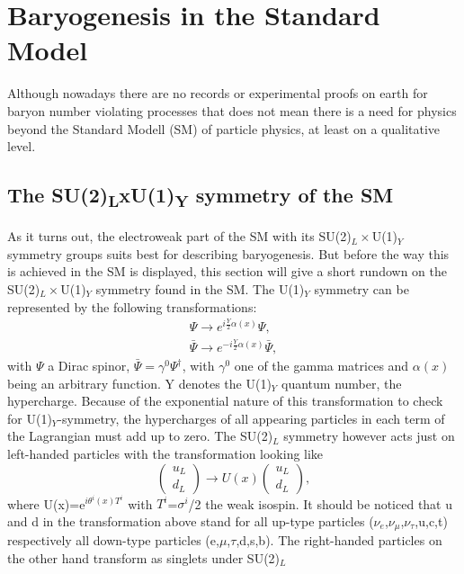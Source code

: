 \section{Baryogenesis in the Standard Model}
Although nowadays there are no records or experimental proofs on earth for baryon number violating processes that does not mean there is a need for physics beyond the Standard Modell (SM) of particle physics, at least on a qualitative level.
\subsection{The SU(2)\textsubscript{L}xU(1)\textsubscript{Y} symmetry of the SM}
As it turns out, the electroweak part of the SM with its SU(2)$_L\times$U(1)$_Y$ symmetry groups suits best for describing baryogenesis. But before the way this is achieved in the SM is displayed, this section will give a short rundown on the SU(2)$_L\times$U(1)$_Y$ symmetry found in the SM.\newline\indent
The U(1)$_Y$ symmetry can be represented by the following transformations:
\begin{align*}
\Psi \longrightarrow e^{i\frac{Y}{2}\alpha(x)}\Psi,\\
\bar{\Psi} \longrightarrow e^{-i\frac{Y}{2}\alpha(x)}\bar{\Psi},
\end{align*}
with $\Psi$ a Dirac spinor, $\bar{\Psi}=\gamma^0\Psi^\dagger$, with $\gamma^0$ one of the gamma matrices and $\alpha(x)$ being an arbitrary function. Y denotes the U(1)$_Y$ quantum number, the hypercharge. Because of the exponential nature of this transformation to check for U(1)$_Y$-symmetry, the hypercharges of all appearing particles in each term of the Lagrangian must add up to zero. \newline\indent
The SU(2)$_L$ symmetry however acts just on left-handed particles with the transformation looking like
\begin{equation*}
	\left(\begin{array}{c}u_L\\d_L\end{array}\right)\longrightarrow U(x)	\left(\begin{array}{c}u_L\\d_L\end{array}\right),
\end{equation*}
where U(x)=e$^{i\theta^i(x)T^i}$ with $T^i$=$\sigma^i$/2 the weak isospin. It should be noticed that u and d in the transformation above stand for all up-type particles ($\nu_e$,$\nu_\mu$,$\nu_\tau$,u,c,t) respectively all down-type particles (e,$\mu$,$\tau$,d,s,b). The right-handed particles on the other hand transform as singlets under SU(2)$_L$
